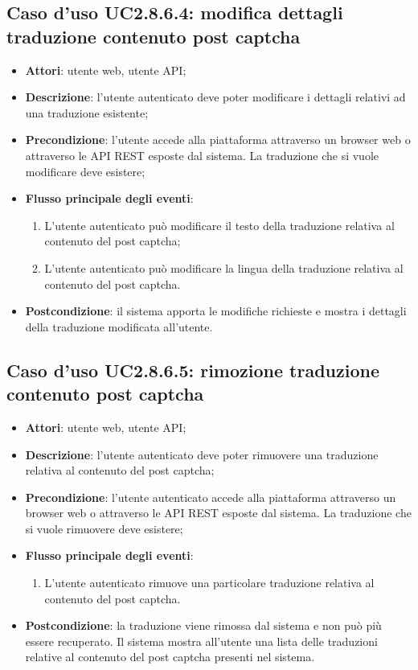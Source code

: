 \subsection{Caso d'uso UC2.8.6.4: modifica dettagli traduzione contenuto post captcha}
\begin{itemize}
\item \textbf{Attori}: utente web, utente API;
\item \textbf{Descrizione}: l'utente autenticato deve poter modificare i dettagli relativi ad una traduzione esistente; 
      \item \textbf{Precondizione}: l'utente accede alla piattaforma attraverso un browser web o attraverso le API REST esposte dal sistema. La traduzione che si vuole modificare deve esistere;

        \item \textbf{Flusso principale degli eventi}:
          \begin{enumerate}
          \item L'utente autenticato può modificare il testo della traduzione relativa al contenuto del post captcha;
          \item L'utente autenticato può modificare la lingua della traduzione relativa al contenuto del post captcha.

      \end{enumerate}
    \item \textbf{Postcondizione}: il sistema apporta le modifiche richieste e mostra i dettagli della traduzione modificata all'utente.
  \end{itemize}
\hypertarget{UC2.8.6.5}{}
\subsection{Caso d'uso UC2.8.6.5: rimozione traduzione contenuto post captcha}
\begin{itemize}
\item \textbf{Attori}: utente web, utente API;
\item \textbf{Descrizione}: l'utente autenticato deve poter rimuovere una traduzione relativa al contenuto del post captcha; 
      \item \textbf{Precondizione}: l'utente autenticato accede alla piattaforma attraverso un browser web o attraverso le API REST esposte dal sistema. La traduzione che si vuole rimuovere deve esistere;

        \item \textbf{Flusso principale degli eventi}:
          \begin{enumerate}
          \item L'utente autenticato rimuove una particolare traduzione relativa al contenuto del post captcha.

      \end{enumerate}
    \item \textbf{Postcondizione}: la traduzione viene rimossa dal sistema e non può più essere recuperato. Il sistema mostra all'utente una lista delle traduzioni relative al contenuto del post captcha presenti nel sistema.
  \end{itemize}
\hypertarget{UC2.8.7}{}

